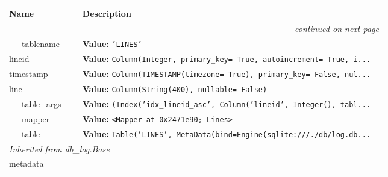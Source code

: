     \vspace{-1cm}
\hspace{\varindent}\begin{longtable}{|p{\varnamewidth}|p{\vardescrwidth}|l}
\cline{1-2}
\cline{1-2} \centering \textbf{Name} & \centering \textbf{Description}& \\
\cline{1-2}
\endhead\cline{1-2}\multicolumn{3}{r}{\small\textit{continued on next page}}\\\endfoot\cline{1-2}
\endlastfoot\raggedright \_\-\_\-t\-a\-b\-l\-e\-n\-a\-m\-e\-\_\-\_\- & \raggedright \textbf{Value:} 
{\tt \texttt{'}\texttt{LINES}\texttt{'}}&\\
\cline{1-2}
\raggedright l\-i\-n\-e\-i\-d\- & \raggedright \textbf{Value:} 
{\tt Column(Integer, primary\_key= True, autoincrement= True, i\texttt{...}}&\\
\cline{1-2}
\raggedright t\-i\-m\-e\-s\-t\-a\-m\-p\- & \raggedright \textbf{Value:} 
{\tt Column(TIMESTAMP(timezone= True), primary\_key= False, nul\texttt{...}}&\\
\cline{1-2}
\raggedright l\-i\-n\-e\- & \raggedright \textbf{Value:} 
{\tt Column(String(400), nullable= False)}&\\
\cline{1-2}
\raggedright \_\-\_\-t\-a\-b\-l\-e\-\_\-a\-r\-g\-s\-\_\-\_\- & \raggedright \textbf{Value:} 
{\tt \texttt{(}Index('idx\_lineid\_asc', Column('lineid', Integer(), tabl\texttt{...}}&\\
\cline{1-2}
\raggedright \_\-\_\-m\-a\-p\-p\-e\-r\-\_\-\_\- & \raggedright \textbf{Value:} 
{\tt {\textless}Mapper at 0x2471e90; Lines{\textgreater}}&\\
\cline{1-2}
\raggedright \_\-\_\-t\-a\-b\-l\-e\-\_\-\_\- & \raggedright \textbf{Value:} 
{\tt Table('LINES', MetaData(bind=Engine(sqlite:///./db/log.db\texttt{...}}&\\
\cline{1-2}
\multicolumn{2}{|l|}{\textit{Inherited from db\_log.Base}}\\
\multicolumn{2}{|p{\varwidth}|}{\raggedright metadata}\\
\cline{1-2}
\end{longtable}

